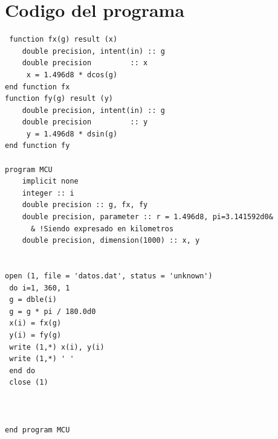 \documentclass[12pt,a4paper,twoside]{article}
\begin{document}
\clearpage
\section{Codigo del programa}
\begin{verbatim}
 function fx(g) result (x)
	double precision, intent(in) :: g
	double precision 	     :: x
	 x = 1.496d8 * dcos(g)
end function fx
function fy(g) result (y)
	double precision, intent(in) :: g
	double precision 	     :: y
	 y = 1.496d8 * dsin(g)
end function fy

program MCU
	implicit none
	integer :: i
	double precision :: g, fx, fy
	double precision, parameter :: r = 1.496d8, pi=3.141592d0&
      & !Siendo expresado en kilometros
	double precision, dimension(1000) :: x, y

 
open (1, file = 'datos.dat', status = 'unknown')
 do i=1, 360, 1
 g = dble(i)
 g = g * pi / 180.0d0
 x(i) = fx(g)
 y(i) = fy(g)
 write (1,*) x(i), y(i)
 write (1,*) ' '
 end do
 close (1)



end program MCU
   
\end{verbatim}
\end{document}
